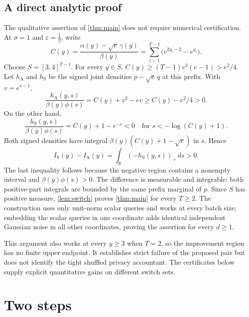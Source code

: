 \documentclass[11pt]{amsart}
\theoremstyle{definition}
\theoremstyle{remark}
\newcommand{\R}{\mathbb R}
\newcommand{\ANTI}{\mathrm{A}}
\newcommand{\SAME}{\mathrm{S}}
\begin{document}
\subsection{A direct analytic proof}\label{sec:analytic}
The qualitative assertion of \cref{thm:main} does not require numerical certification. At $\sigma=1$ and $\varepsilon=\frac12$, write
\[
C(y)=\frac{\alpha(y)-\sqrt e\,\gamma(y)}{\beta(y)}
=\sum_{i=1}^{T-1}\bigl(e^{2y_i-2}-e^{y_i}\bigr).
\]
Choose $S=[3,4]^{T-1}$. For every $y\in S$,
$C(y)\ge (T-1)e^3(e-1)>e^2/4$. Let $h_{\ANTI}$ and $h_{\SAME}$ be the signed joint densities $p-\sqrt e\,q$ at this prefix. With $v=e^{s-1}$,
\[
\frac{h_{\ANTI}(y,s)}{\beta(y)\phi(s)}
=C(y)+v^2-ev\ge C(y)-e^2/4>0.
\]
On the other hand,
\[
\frac{h_{\SAME}(y,s)}{\beta(y)\phi(s)}
=C(y)+1-e^{-s}<0
\quad\text{for }s<-\log(C(y)+1).
\]
Both signed densities have integral $\beta(y)(C(y)+1-\sqrt e)$ in $s$. Hence
\[
I_{\SAME}(y)-I_{\ANTI}(y)
=\int_{\R}(-h_{\SAME}(y,s))_+\,ds>0.
\]
The last inequality follows because the negative region contains a nonempty interval and $\beta(y)\phi(s)>0$. The difference is measurable and integrable: both positive-part integrals are bounded by the same prefix marginal of $p$. Since $S$ has positive measure, \cref{lem:switch} proves \cref{thm:main} for every $T\ge2$. The construction uses only unit-norm scalar queries and works at every batch size; embedding the scalar queries in one coordinate adds identical independent Gaussian noise in all other coordinates, proving the assertion for every $d\ge1$.

This argument also works at every $y\ge3$ when $T=2$, so the improvement region has no finite upper endpoint. It establishes strict failure of the proposed pair but does not identify the tight shuffled privacy accountant. The certificates below supply explicit quantitative gains on different switch sets.

\section{Two steps}\label{sec:T2}
\end{document}
